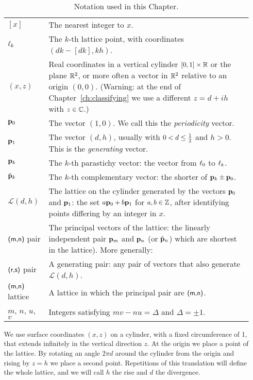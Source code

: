 \begin{table}
		\caption{Notation used in this Chapter.}
			\label{tab:notation}\begin{tabularx}{\textwidth}{l|X}
			\hline
		$[x]$ & The nearest integer to $x$. 
		\\
		$\ell_{{k}}$ & The $k$-th lattice point, with coordinates $(dk - [dk],kh)$. 
				\\
				$(x,z)$ & Real coordinates in a vertical cylinder $[0,1]\times\mathbb{R}$ or the plane $\mathbb{R}^2$, or more often a vector in $\mathbb{R}^2$ relative to an origin $(0,0)$. (Warning: at the end of Chapter~\ref{ch:classifying} we use a different $z=d+ih$ with $z\in\mathbb{C}$.)
				\\
				${\mathbf p}_{0}$ & The vector $(1,0)$. We call this the \textit{periodicity} vector.\index{parastichy vector!periodicity vector}
				\\
				${\mathbf p}_{1}$ & The vector $(d,h)$, usually with $0< d\leq \textstyle{\frac{1}{2}}$ and $h>0$. This is the \textit{generating} vector.\index{parastichy vector!generating vector} 
		\\
			
				${\mathbf p}_{k}$ & The $k$-th parastichy\index{parastichy vector} vector: the vector from $\ell_{{0}}$ to $\ell_{{k}}$.
			\\
					$\hat{\mathbf p}_{k}$ & The $k$-th complementary vector: the shorter of ${\mathbf p}_{k}\pm{\mathbf p}_{0}$.\index{parastichy vector!complementary vector}
				\\
			$\mathcal{L}(d,h)$ & The lattice on the cylinder generated by the vectors ${\mathbf p}_{0}$ and ${\mathbf p}_{1}$:	the set $a{\mathbf p}_{0}+b{\mathbf p}_{1}$ for $a,b\in \mathbb{Z}$, after identifying points differing by an integer in $x$. 
\\	
				$\textsf{(m,n)}$ pair & The principal vectors\index{pairs of parastichy vectors!principal pair} of the lattice: the linearly independent pair $	{\mathbf p}_{m}$ and ${\mathbf p}_{n}$ (or $\hat{\mathbf p}_{n}$)  which are shortest in the lattice). More generally:
				\\
				$\textsf{(r,s)}$ pair & A generating pair: any pair of vectors that also generate $\mathcal{L}(d,h)$.\index{pairs of parastichy vectors!generating pair}
				\\
				$\textsf{(m,n)}$ lattice & A lattice in which the principal pair 
				are $\textsf{(m,n)}$.
				\\
				$m$, $n$, $u$, $v$ & Integers satisfying $m v- n u=\Delta$ and $\Delta=\pm 1$.\index{co-prime integers!B\'ezout relation}
				\\\hline
\end{tabularx} 
\end{table}
%
We use surface coordinates $(x,z)$ on a cylinder, with a fixed circumference of 1, that extends infinitely in the vertical direction $z$.  At the origin we place a point of the lattice. By rotating an angle $2\pi d$ around the cylinder from the origin and rising by $z=h$
we place a second point. Repetitions of this translation will define the whole lattice,  and we will call  
$h$ the {rise} and $d$ the divergence. 



